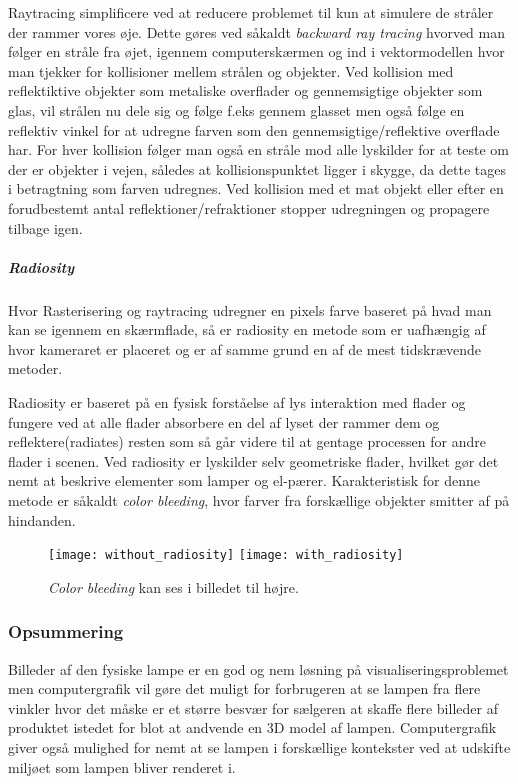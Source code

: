 Raytracing simplificere ved at reducere problemet til kun at simulere de stråler der rammer vores øje. Dette gøres ved såkaldt \textit{backward ray tracing} hvorved man følger en stråle fra øjet, igennem computerskærmen og ind i vektormodellen hvor man tjekker for kollisioner mellem strålen og objekter. Ved kollision med reflektiktive objekter som metaliske overflader og gennemsigtige objekter som glas, vil strålen nu dele sig og følge f.eks gennem glasset men også følge en reflektiv vinkel for at udregne farven som den gennemsigtige/reflektive overflade har. For hver kollision følger man også en stråle mod alle lyskilder for at teste om der er objekter i vejen, således at kollisionspunktet ligger i skygge, da dette tages i betragtning som farven udregnes. Ved kollision med et mat objekt eller efter en forudbestemt antal reflektioner/refraktioner stopper udregningen og propagere tilbage igen.

\subparagraph{Radiosity \cite{radiosity_by_wpi,radiosity_by_uob}}
Hvor Rasterisering og raytracing udregner en pixels farve baseret på hvad man kan se igennem en skærmflade, så er radiosity en metode som er uafhængig af hvor kameraret er placeret og er af samme grund en af de mest tidskrævende metoder. 

Radiosity er baseret på en fysisk forståelse af lys interaktion med flader og fungere ved at alle flader absorbere en del af lyset der rammer dem og reflektere(radiates) resten som så går videre til at gentage processen for andre flader i scenen. Ved radiosity er lyskilder selv geometriske flader, hvilket gør det nemt at beskrive elementer som lamper og el-pærer. Karakteristisk for denne metode er såkaldt \textit{color bleeding}, hvor farver fra forskællige objekter smitter af på hindanden.
\begin{figure}[H]
    \centering
    \texttt{[image: without\_radiosity]}
    \texttt{[image: with\_radiosity]}
    \caption{\textit{Color bleeding} kan ses i billedet til højre.}
    \label{fig:colorbleeding}
\end{figure}

\subsubsection{Opsummering}
Billeder af den fysiske lampe er en god og nem løsning på visualiseringsproblemet men computergrafik vil gøre det muligt for forbrugeren at se lampen fra flere vinkler hvor det måske er et større besvær for sælgeren at skaffe flere billeder af produktet istedet for blot at andvende en 3D model af lampen. Computergrafik giver også mulighed for nemt at se lampen i forskællige kontekster ved at udskifte miljøet som lampen bliver renderet i. 


